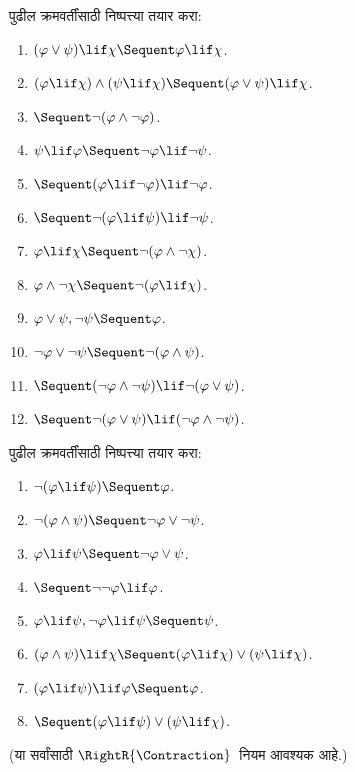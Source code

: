 \begin{prob}
पुढील क्रमवर्तींसाठी निष्पत्त्या तयार करा:
\begin{enumerate}
\item $(\varphi \lor \psi) \lif \chi \Sequent \varphi \lif \chi$.
\item $(\varphi \lif \chi) \land (\psi \lif \chi) \Sequent (\varphi \lor \psi) \lif \chi$.
\item $\Sequent \lnot(\varphi \land \lnot \varphi)$.
\item $\psi \lif \varphi \Sequent \lnot \varphi \lif \lnot \psi$.
\item $\Sequent (\varphi \lif \lnot \varphi) \lif \lnot \varphi$.
\item $\Sequent \lnot(\varphi \lif \psi) \lif \lnot \psi$.
\item $\varphi \lif \chi \Sequent \lnot (\varphi \land \lnot \chi)$.
\item $\varphi \land \lnot \chi \Sequent \lnot (\varphi \lif \chi)$.
\item $\varphi \lor \psi, \lnot \psi \Sequent \varphi$.
\item $\lnot \varphi \lor \lnot \psi \Sequent \lnot(\varphi \land \psi)$.
\item $\Sequent (\lnot \varphi \land \lnot \psi) \lif\lnot(\varphi \lor \psi)$.
\item $\Sequent \lnot(\varphi \lor \psi) \lif (\lnot \varphi \land \lnot \psi)$.
\end{enumerate}
\end{prob}

\begin{prob}
पुढील क्रमवर्तींसाठी निष्पत्त्या तयार करा:
\begin{enumerate}
\item $\lnot(\varphi \lif \psi) \Sequent \varphi$.
\item $\lnot(\varphi \land \psi) \Sequent \lnot \varphi \lor \lnot \psi$.
\item $\varphi \lif \psi \Sequent \lnot \varphi \lor \psi$.
\item $\Sequent \lnot \lnot \varphi \lif \varphi$.
\item $\varphi \lif \psi, \lnot \varphi \lif \psi \Sequent \psi$.
\item $(\varphi \land \psi) \lif \chi \Sequent (\varphi \lif \chi) \lor (\psi \lif \chi)$.
\item $(\varphi \lif \psi) \lif \varphi \Sequent \varphi$.
\item $\Sequent (\varphi \lif \psi) \lor (\psi \lif \chi)$.
\end{enumerate}
(या सर्वांसाठी $\RightR{\Contraction}$~नियम आवश्यक आहे.)
\end{prob}








